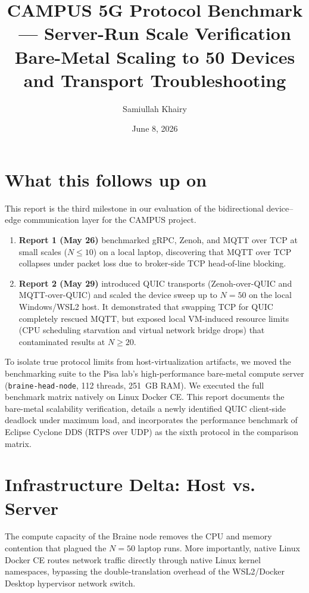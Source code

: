 \documentclass[11pt,a4paper]{article}
\title{CAMPUS 5G Protocol Benchmark --- Server-Run Scale Verification\\[0.3em]
\large Bare-Metal Scaling to 50 Devices and Transport Troubleshooting}
\author{Samiullah Khairy}
\date{June 8, 2026}
\begin{document}
\maketitle

\section{What this follows up on}

This report is the third milestone in our evaluation of the bidirectional device--edge communication layer for the CAMPUS project. 
\begin{enumerate}
    \item \textbf{Report 1 (May 26)} benchmarked gRPC, Zenoh, and MQTT over TCP at small scales ($N \le 10$) on a local laptop, discovering that MQTT over TCP collapses under packet loss due to broker-side TCP head-of-line blocking.
    \item \textbf{Report 2 (May 29)} introduced QUIC transports (Zenoh-over-QUIC and MQTT-over-QUIC) and scaled the device sweep up to $N=50$ on the local Windows/WSL2 host. It demonstrated that swapping TCP for QUIC completely rescued MQTT, but exposed local VM-induced resource limits (CPU scheduling starvation and virtual network bridge drops) that contaminated results at $N \ge 20$.
\end{enumerate}

To isolate true protocol limits from host-virtualization artifacts, we moved the benchmarking suite to the Pisa lab's high-performance bare-metal compute server (\texttt{braine-head-node}, 112 threads, 251~GB RAM). We executed the full benchmark matrix natively on Linux Docker CE. This report documents the bare-metal scalability verification, details a newly identified QUIC client-side deadlock under maximum load, and incorporates the performance benchmark of Eclipse Cyclone DDS (RTPS over UDP) as the sixth protocol in the comparison matrix.

\section{Infrastructure Delta: Host vs. Server}

The compute capacity of the Braine node removes the CPU and memory contention that plagued the $N=50$ laptop runs. More importantly, native Linux Docker CE routes network traffic directly through native Linux kernel namespaces, bypassing the double-translation overhead of the WSL2/Docker Desktop hypervisor network switch.
\end{document}
